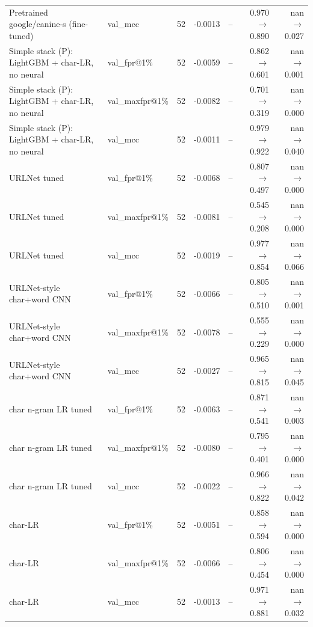 \begin{table}[t]
\begin{tabular}{llrrrrr}
Pretrained google/canine-s (fine-tuned) & val\_mcc & 52 & -0.0013 & -- & 0.970$\rightarrow$0.890 & nan$\rightarrow$0.027 \\
Simple stack (P): LightGBM + char-LR, no neural & val\_fpr@1\% & 52 & -0.0059 & -- & 0.862$\rightarrow$0.601 & nan$\rightarrow$0.001 \\
Simple stack (P): LightGBM + char-LR, no neural & val\_maxfpr@1\% & 52 & -0.0082 & -- & 0.701$\rightarrow$0.319 & nan$\rightarrow$0.000 \\
Simple stack (P): LightGBM + char-LR, no neural & val\_mcc & 52 & -0.0011 & -- & 0.979$\rightarrow$0.922 & nan$\rightarrow$0.040 \\
URLNet tuned & val\_fpr@1\% & 52 & -0.0068 & -- & 0.807$\rightarrow$0.497 & nan$\rightarrow$0.000 \\
URLNet tuned & val\_maxfpr@1\% & 52 & -0.0081 & -- & 0.545$\rightarrow$0.208 & nan$\rightarrow$0.000 \\
URLNet tuned & val\_mcc & 52 & -0.0019 & -- & 0.977$\rightarrow$0.854 & nan$\rightarrow$0.066 \\
URLNet-style char+word CNN & val\_fpr@1\% & 52 & -0.0066 & -- & 0.805$\rightarrow$0.510 & nan$\rightarrow$0.001 \\
URLNet-style char+word CNN & val\_maxfpr@1\% & 52 & -0.0078 & -- & 0.555$\rightarrow$0.229 & nan$\rightarrow$0.000 \\
URLNet-style char+word CNN & val\_mcc & 52 & -0.0027 & -- & 0.965$\rightarrow$0.815 & nan$\rightarrow$0.045 \\
char n-gram LR tuned & val\_fpr@1\% & 52 & -0.0063 & -- & 0.871$\rightarrow$0.541 & nan$\rightarrow$0.003 \\
char n-gram LR tuned & val\_maxfpr@1\% & 52 & -0.0080 & -- & 0.795$\rightarrow$0.401 & nan$\rightarrow$0.000 \\
char n-gram LR tuned & val\_mcc & 52 & -0.0022 & -- & 0.966$\rightarrow$0.822 & nan$\rightarrow$0.042 \\
char-LR & val\_fpr@1\% & 52 & -0.0051 & -- & 0.858$\rightarrow$0.594 & nan$\rightarrow$0.000 \\
char-LR & val\_maxfpr@1\% & 52 & -0.0066 & -- & 0.806$\rightarrow$0.454 & nan$\rightarrow$0.000 \\
char-LR & val\_mcc & 52 & -0.0013 & -- & 0.971$\rightarrow$0.881 & nan$\rightarrow$0.032 \\
\bottomrule
\end{tabular}
\end{table}